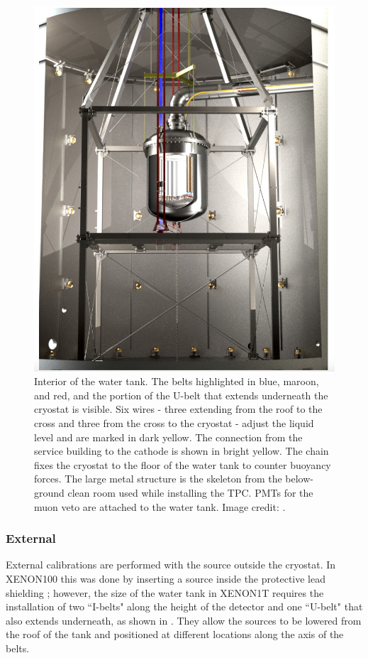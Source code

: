 \begin{figure}
\centering
\includegraphics[width=\textwidth]{WaterTankInside}
\caption[Interior of the water tank.]{Interior of the water tank.  The belts highlighted in blue, maroon, and red, and the portion of the
U-belt that extends
underneath the cryostat is visible.  Six wires - three extending from the roof to the cross and three from the cross to the
cryostat - adjust the liquid level and are marked in dark yellow.  The connection from the service building to the cathode is shown in
bright yellow.  The chain fixes the cryostat to the floor of the water tank to counter buoyancy forces.  The large metal structure is the
skeleton from the below-ground clean room used while installing the TPC.  PMTs for the muon veto are attached to the water tank.  Image
credit: .}
\label{fig:water_tank_inside}
\end{figure}



\subsubsection{External}
\label{subsubsec:xenon1t_calibrations_external}
External calibrations are performed with the source outside the cryostat.  In XENON100 this was done by inserting a source inside the
protective lead
shielding ; however, the size of the water tank in XENON1T requires the installation of two ``I-belts"
along the height of the detector and one ``U-belt" that also extends underneath, as shown in
.  They
allow the sources to be lowered from the roof of the tank and positioned at different locations along the axis of the
belts.

